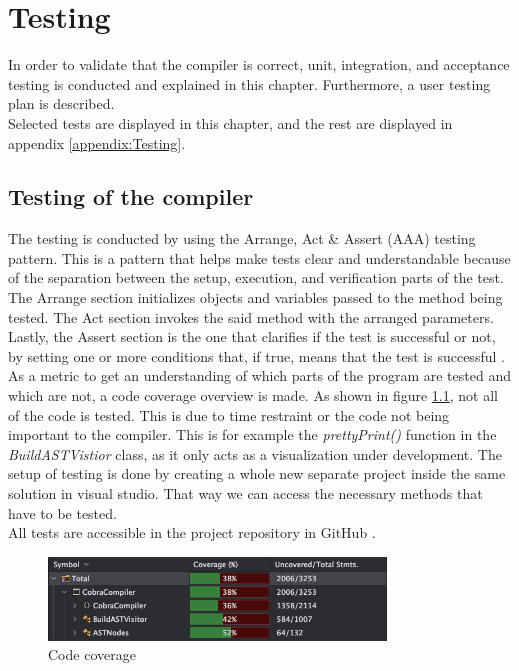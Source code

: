 \chapter{Testing}\label{ch:testing}
In order to validate that the compiler is correct, unit, integration, and acceptance testing is conducted and explained in this chapter. Furthermore, a user testing plan is described.\\
Selected tests are displayed in this chapter, and the rest are displayed in appendix \ref{appendix:Testing}.

\section{Testing of the \lang compiler} \label{sec:test_strat}
The testing is conducted by using the Arrange, Act \& Assert (AAA) testing pattern. This is a pattern that helps make tests clear and understandable because of the separation between the setup, execution, and verification parts of the test. The Arrange section initializes objects and variables passed to the method being tested. The Act section invokes the said method with the arranged parameters. Lastly, the Assert section is the one that clarifies if the test is successful or not, by setting one or more conditions that, if true, means that the test is successful \cite{unittestbasics}. As a metric to get an understanding of which parts of the program are tested and which are not, a code coverage overview is made. As shown in figure \ref{fig:code_coverage}, not all of the code is tested. This is due to time restraint or the code not being important to the compiler. This is for example the \textit{prettyPrint()} function in the \textit{BuildASTVistior} class, as it only acts as a visualization under development. The setup of testing is done by creating a whole new separate project inside the same solution in visual studio. That way we can access the necessary methods that have to be tested.\\
All tests are accessible in the project repository in GitHub \cite{p4-project-rep}.

\begin{figure}[H]
    \begin{center}
        \includegraphics[width=0.8\textwidth]{Files/Billeder: Test/code_coverage.png}
    \end{center}
    \caption{Code coverage}
    \label{fig:code_coverage}
\end{figure}

